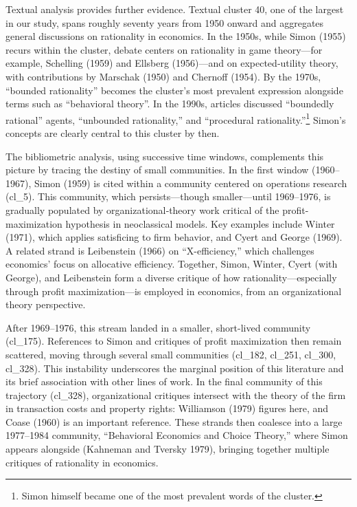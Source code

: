 \documentclass[
]{interact}
\begin{document}
Textual analysis provides further evidence. Textual cluster 40, one of
the largest in our study, spans roughly seventy years from 1950 onward
and aggregates general discussions on rationality in economics. In the
1950s, while Simon (1955) recurs within the cluster, debate centers on
rationality in game theory---for example, Schelling (1959) and Ellsberg
(1956)---and on expected‐utility theory, with contributions by Marschak
(1950) and Chernoff (1954). By the 1970s, ``bounded rationality''
becomes the cluster's most prevalent expression alongside terms such as
``behavioral theory''. In the 1990s, articles discussed ``boundedly
rational'' agents, ``unbounded rationality,'' and ``procedural
rationality.''\footnote{Simon himself became one of the most prevalent
  words of the cluster.} Simon's concepts are clearly central to this
cluster by then.

The bibliometric analysis, using successive time windows, complements
this picture by tracing the destiny of small communities. In the first
window (1960--1967), Simon (1959) is cited within a community centered
on operations research (cl\_5). This community, which persists---though
smaller---until 1969--1976, is gradually populated by
organizational‐theory work critical of the profit-maximization
hypothesis in neoclassical models. Key examples include Winter (1971),
which applies satisficing to firm behavior, and Cyert and George (1969).
A related strand is Leibenstein (1966) on ``X-efficiency,'' which
challenges economics' focus on allocative efficiency. Together, Simon,
Winter, Cyert (with George), and Leibenstein form a diverse critique of
how rationality---especially through profit maximization---is employed
in economics, from an organizational theory perspective.

After 1969--1976, this stream landed in a smaller, short-lived community
(cl\_175). References to Simon and critiques of profit maximization then
remain scattered, moving through several small communities (cl\_182,
cl\_251, cl\_300, cl\_328). This instability underscores the marginal
position of this literature and its brief association with other lines
of work. In the final community of this trajectory (cl\_328),
organizational critiques intersect with the theory of the firm in
transaction costs and property rights: Williamson (1979) figures here,
and Coase (1960) is an important reference. These strands then coalesce
into a large 1977--1984 community, ``Behavioral Economics and Choice
Theory,'' where Simon appears alongside (Kahneman and Tversky 1979),
bringing together multiple critiques of rationality in economics.
\end{document}
